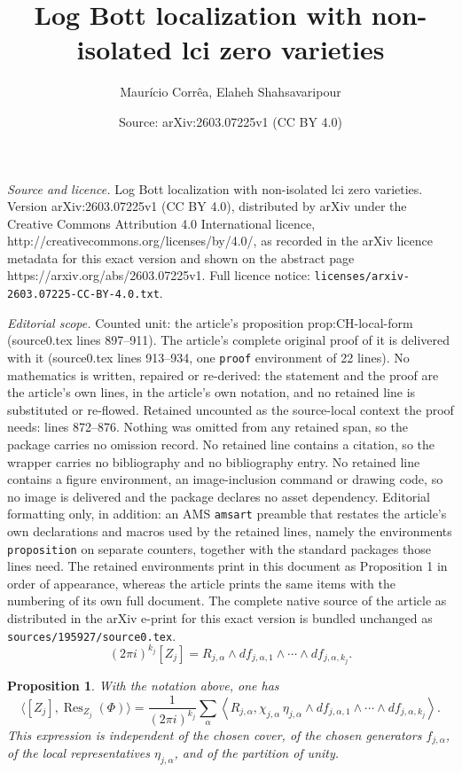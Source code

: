 \documentclass[10pt,a4paper]{amsart}
\title{Log Bott localization with non-isolated lci zero varieties}
\author{Maur\'icio Corr\^ea, Elaheh Shahsavaripour}
\date{Source: arXiv:2603.07225v1 (CC BY 4.0)}
\newtheorem{proposition}{Proposition}
\begin{document}
\maketitle

\noindent\emph{Source and licence.} Log Bott localization with non-isolated lci zero varieties. Version arXiv:2603.07225v1 (CC BY 4.0), distributed by arXiv under the Creative Commons Attribution 4.0 International licence, http://creativecommons.org/licenses/by/4.0/, as recorded in the arXiv licence metadata for this exact version and shown on the abstract page https://arxiv.org/abs/2603.07225v1. Full licence notice: \texttt{licenses/arxiv-2603.07225-CC-BY-4.0.txt}.\par\smallskip

\noindent\textit{Editorial scope.} Counted unit: the article's proposition prop:CH-local-form (source0.tex lines 897--911). The article's complete original proof of it is delivered with it (source0.tex lines 913--934, one \texttt{proof} environment of 22 lines). No mathematics is written, repaired or re-derived: the statement and the proof are the article's own lines, in the article's own notation, and no retained line is substituted or re-flowed.  Retained uncounted as the source-local context the proof needs: lines 872--876.  Nothing was omitted from any retained span, so the package carries no omission record.  No retained line contains a citation, so the wrapper carries no bibliography and no bibliography entry.  No retained line contains a figure environment, an image-inclusion command or drawing code, so no image is delivered and the package declares no asset dependency.  Editorial formatting only, in addition: an AMS \texttt{amsart} preamble that restates the article's own declarations and macros used by the retained lines, namely the environments \texttt{proposition} on separate counters, together with the standard packages those lines need.  The retained environments print in this document as Proposition 1 in order of appearance, whereas the article prints the same items with the numbering of its own full document.  The complete native source of the article as distributed in the arXiv e-print for this exact version is bundled unchanged as \texttt{sources/195927/source0.tex}.
\begin{equation}\label{eq:CH-PL-local}
(2\pi i)^{k_j}[Z_j]
=
R_{j,\alpha}\wedge df_{j,\alpha,1}\wedge\cdots\wedge df_{j,\alpha,k_j}.
\end{equation}

\begin{proposition}\label{prop:CH-local-form}
With the notation above, one has
\begin{equation}\label{eq:CH-local-form}
\langle [Z_j],\operatorname{Res}_{Z_j}(\Phi)\rangle
=
\frac{1}{(2\pi i)^{k_j}}
\sum_\alpha
\left\langle
R_{j,\alpha},
\chi_{j,\alpha}\,\eta_{j,\alpha}\wedge
df_{j,\alpha,1}\wedge\cdots\wedge df_{j,\alpha,k_j}
\right\rangle.
\end{equation}
This expression is independent of the chosen cover, of the chosen generators $f_{j,\alpha}$, of the local representatives $\eta_{j,\alpha}$, and of the partition of unity.
\end{proposition}
\end{document}
